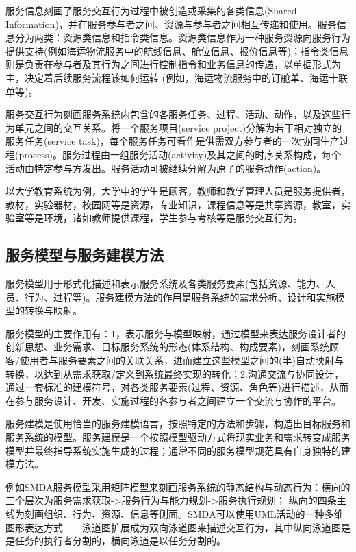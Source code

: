 \documentclass[11pt,a4paper]{article}
\begin{document}
\begin{CJK}{UTF8}{gbsn}
服务信息刻画了服务交互行为过程中被创造或采集的各类信息(Shared Information)，并在服务参与者之间、资源与参与者之间相互传递和使用。服务信息分为两类：资源类信息和指令类信息。资源类信息作为一种服务资源向服务行为提供支持(例如海运物流服务中的航线信息、舱位信息、报价信息等)；指令类信息则是负责在参与者及其行为之间进行控制指令和业务信息的传递，以单据形式为主，决定着后续服务流程该如何运转 (例如，海运物流服务中的订舱单、海运十联单等)。

服务交互行为刻画服务系统内包含的各服务任务、过程、活动、动作，以及这些行为单元之间的交互关系。将一个服务项目(service project)分解为若干相对独立的服务任务(service task)，每个服务任务可看作是供需双方参与者的一次协同生产过程(process)。服务过程由一组服务活动(activity)及其之间的时序关系构成，每个活动由特定参与方发出。服务活动可被继续分解为原子的服务动作(action)。

以大学教育系统为例，大学中的学生是顾客，教师和教学管理人员是服务提供者，教材，实验器材，校园网等是资源，专业知识，课程信息等是共享资源，教室，实验室等是环境，诸如教师提供课程，学生参与考核等是服务交互行为。

\subsection{服务模型与服务建模方法}

服务模型用于形式化描述和表示服务系统及各类服务要素(包括资源、能力、人员、行为、过程等)。服务建模方法的作用是服务系统的需求分析、设计和实施模型的转换与映射。

服务模型的主要作用有：1，表示服务与模型映射，通过模型来表达服务设计者的创新思想、业务需求、目标服务系统的形态(体系结构、构成要素)，刻画系统顾客/使用者与服务要素之间的关联关系，进而建立这些模型之间的(半)自动映射与转换，以达到从需求获取/定义到系统最终实现的转化；2.沟通交流与协同设计，通过一套标准的建模符号，对各类服务要素(过程、资源、角色等)进行描述，从而在参与服务设计、开发、实施过程的各参与者之间建立一个交流与协作的平台。

服务建模是使用恰当的服务建模语言，按照特定的方法和步骤，构造出目标服务和服务系统的模型。服务建模是一个按照模型驱动方式将现实业务和需求转变成服务模型并最终指导系统实施生成的过程；通常不同的服务模型规范具有自身独特的建模方法。 

例如SMDA服务模型采用矩阵模型来刻画服务系统的静态结构与动态行为：横向的三个层次为服务需求获取->服务行为与能力规划->服务执行规划； 纵向的四条主线为刻画组织、行为、资源、信息等侧面。SMDA可以使用UML活动的一种多维图形表达方式——泳道图扩展成为双向泳道图来描述交互行为，其中纵向泳道图是是任务的执行者分割的，横向泳道是以任务分割的。



\end{CJK}
\end{document}
